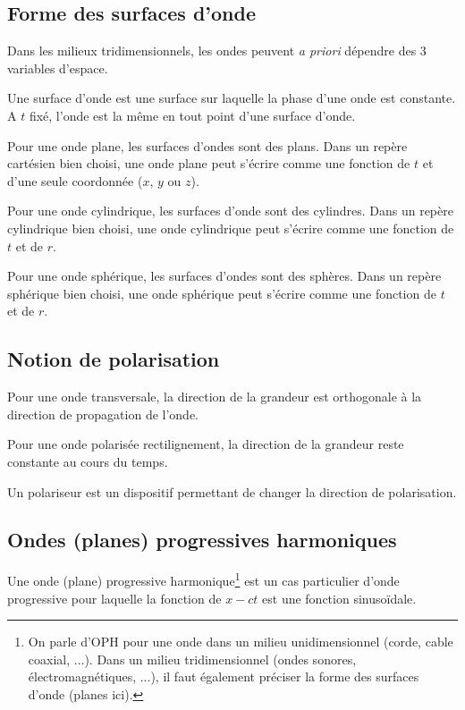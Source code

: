 \subsection{Forme des surfaces d'onde}
Dans les milieux tridimensionnels, les ondes peuvent \textit{a priori} dépendre des 3 variables d'espace.

Une surface d'onde est une surface sur laquelle la phase d'une onde est constante. A $t$ fixé, l'onde est la même en tout point d'une surface d'onde.

Pour une onde plane, les surfaces d'ondes sont des plans. Dans un repère cartésien bien choisi, une onde plane peut s'écrire comme une fonction de $t$ et d'une seule coordonnée ($x$, $y$ ou $z$).

Pour une onde cylindrique, les surfaces d'onde sont des cylindres. Dans un repère cylindrique bien choisi, une onde cylindrique peut s'écrire comme une fonction de $t$ et de $r$.

Pour une onde sphérique, les surfaces d'ondes sont des sphères. Dans un repère sphérique bien choisi, une onde sphérique peut s'écrire comme une fonction de $t$ et de $r$.


\subsection{Notion de polarisation}
Pour une onde transversale, la direction de la grandeur est orthogonale à la direction de propagation de l'onde.

Pour une onde polarisée rectilignement, la direction de la grandeur reste constante au cours du temps.


Un polariseur est un dispositif permettant de changer la direction de polarisation.

\subsection{Ondes (planes) progressives harmoniques}
Une onde (plane) progressive harmonique\footnote{On parle d'OPH pour une onde dans un milieu unidimensionnel (corde, cable coaxial, ...). Dans un milieu tridimensionnel (ondes sonores, électromagnétiques, ...), il faut également préciser la forme des surfaces d'onde (planes ici).} est un cas particulier d'onde progressive pour laquelle la fonction de $x-ct$ est une fonction sinusoïdale.


